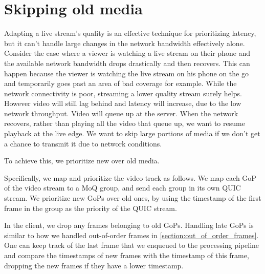 \section{Skipping old media}\label{chapter:skipping_old_media}
Adapting a live stream's quality is an effective technique for prioritizing latency, but it can't handle large changes in the network bandwidth effectively alone. Consider the case where a viewer is watching a live stream on their phone and the available network bandwidth drops drastically and then recovers. This can happen because the viewer is watching the live stream on his phone on the go and temporarily goes past an area of bad coverage for example. While the network connectivity is poor, streaming a lower quality stream surely helps. However video will still lag behind and latency will increase, due to the low network throughput. Video will queue up at the server. When the network recovers, rather than playing all the video that queue up, we want to resume playback at the live edge. We want to skip large portions of media if we don't get a chance to transmit it due to network conditions.

To achieve this, we prioritize new over old media. 

Specifically, we map and prioritize the video track as follows. We map each GoP of the video stream to a MoQ group, and send each group in its own QUIC stream. We prioritize new GoPs over old ones, by using the timestamp of the first frame in the group as the priority of the QUIC stream.

In the client, we drop any frames belonging to old GoPs. Handling late GoPs is similar to how we handled out-of-order frames in \autoref{section:out_of_order_frames}. One can keep track of the last frame that we enqueued to the processing pipeline and compare the timestamps of new frames with the timestamp of this frame, dropping the new frames if they have a lower timestamp. %


